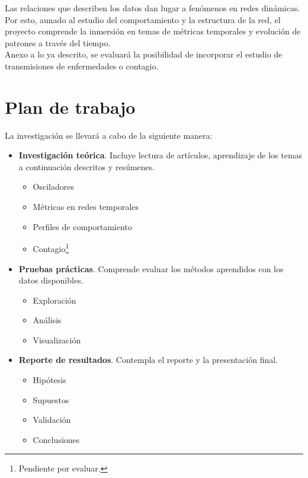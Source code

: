 \documentclass[10pt]{article}
\begin{document}
Las relaciones que describen los datos dan lugar a fenómenos en redes
dinámicas. Por esto, aunado al estudio del comportamiento y la estructura
de la red, el proyecto comprende la inmersión en temas de métricas temporales y
evolución de patrones a través del tiempo.\\

Anexo a lo ya descrito, se evaluará la posibilidad de incorporar el estudio de
transmisiones de enfermedades o contagio.



\section{Plan de trabajo}
\label{sec:plan}

La investigación se llevará a cabo de la siguiente manera:

\begin{itemize}
 \item {\bf Investigación teórica}. Incluye lectura de artículos, aprendizaje
  de los temas a continuación descritos y resúmenes.
  \begin{itemize}
   \item Osciladores
   \item Métricas en redes temporales
   \item Perfiles de comportamiento 
   \item Contagio\footnote{Pendiente por evaluar.}
  \end{itemize}
 \item {\bf Pruebas prácticas}. Comprende evaluar los métodos aprendidos con
 los datos disponibles.
  \begin{itemize}
   \item Exploración
   \item Análisis
   \item Visualización
  \end{itemize}
 \item {\bf Reporte de resultados}. Contempla el reporte y la presentación final.
  \begin{itemize}
   \item Hipótesis
   \item Supuestos
   \item Validación
   \item Conclusiones
  \end{itemize}
\end{itemize}




% 
% 
\end{document}
